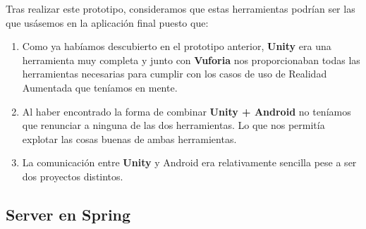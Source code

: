 \begin{flushleft}
    Tras realizar este prototipo, consideramos que estas herramientas podrían ser las que usásemos en la aplicación final puesto que:
    \begin{enumerate}
    \item Como ya habíamos descubierto en el prototipo anterior, \textbf{Unity} era una herramienta muy completa y junto con \textbf{Vuforia} nos proporcionaban todas las herramientas necesarias para cumplir con los casos de uso de Realidad Aumentada que teníamos en mente.
    \item Al haber encontrado la forma de combinar \textbf{Unity + Android} no teníamos que renunciar a ninguna de las dos herramientas. Lo que nos permitía explotar las cosas buenas de ambas herramientas.
    \item La comunicación entre \textbf{Unity} y Android era relativamente sencilla pese a ser dos proyectos distintos.
    \end{enumerate}
\end{flushleft}

\newpage
\subsection{Server en Spring} 
\label{makereference3.6.6}

